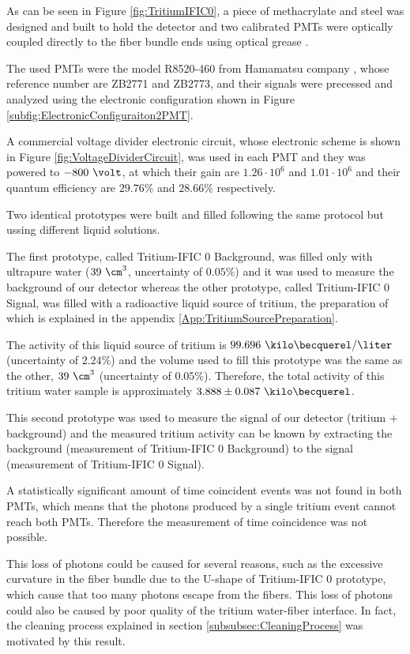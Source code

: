As can be seen in Figure \ref{fig:TritiumIFIC0}, a piece of methacrylate and steel was designed and built to hold the detector and two calibrated PMTs were optically coupled directly to the fiber bundle ends using optical grease \cite{OpticalGrease}.

The used PMTs were the model R8520-460 from Hamamatsu company \cite{DataSheetPMTs}, whose reference number are ZB2771 and ZB2773, and their signals were precessed and analyzed using the electronic configuration shown in Figure \ref{subfig:ElectronicConfiguraiton2PMT}.

A commercial voltage divider electronic circuit, whose electronic scheme is shown in Figure \ref{fig:VoltageDividerCircuit}, was used in each PMT and they was powered to $-800~\volt$, at which their gain are $1.26 \cdot{} 10^6$ and $1.01 \cdot{} 10^6$ and their quantum efficiency are $29.76\%$ and $28.66\%$ respectively.

Two identical prototypes were built and filled following the same protocol but ussing different liquid solutions. 

The first prototype, called Tritium-IFIC 0 Background, was filled only with  ultrapure water ($39~\cm^3$, uncertainty of $0.05\%$) and it was used to measure the background of our detector whereas the other prototype, called Tritium-IFIC 0 Signal, was filled with a radioactive liquid source of tritium, the preparation of which is explained in the appendix \ref{App:TritiumSourcePreparation}.

The activity of this liquid source of tritium is $99.696~\kilo\becquerel/\liter$ (uncertainty of $2.24\%$) and the volume used to fill this prototype was the same as the other, $39~\cm^3$ (uncertainty of $0.05\%$). Therefore, the total activity of this tritium water sample is approximately $3.888 \pm 0.087~\kilo\becquerel$. 

This second prototype was used to measure the signal of our detector (tritium + background) and the measured tritium activity can be known by extracting the background (measurement of Tritium-IFIC 0 Background) to the signal (measurement of Tritium-IFIC 0 Signal).

A statistically significant amount of time coincident events was not found in both PMTs, which means that the photons produced by a single tritium event cannot reach both PMTs. Therefore the measurement of time coincidence was not possible. 

This loss of photons could be caused for several reasons, such as the excessive curvature in the fiber bundle due to the U-shape of Tritium-IFIC 0 prototype, which cause that too many photons escape from the fibers. This loss of photons could also be caused by poor quality of the tritium water-fiber interface. In fact, the cleaning process explained in section \ref{subsubsec:CleaningProcess} was motivated by this result.

